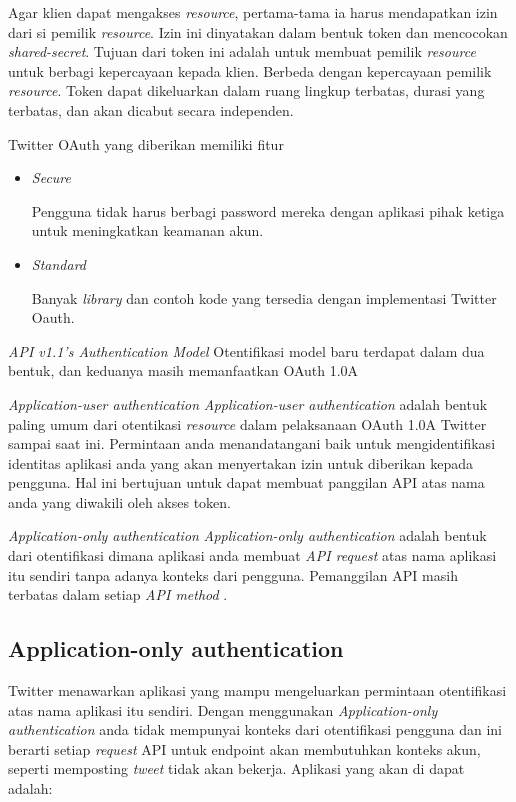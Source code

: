 Agar klien dapat mengakses \textit{resource}, pertama-tama ia harus mendapatkan izin dari si pemilik \textit{resource}. Izin ini dinyatakan dalam bentuk token dan mencocokan \textit{shared-secret}. Tujuan dari token ini adalah untuk membuat pemilik \textit{resource} untuk berbagi kepercayaan kepada klien. Berbeda dengan kepercayaan pemilik \textit{resource}. Token dapat dikeluarkan dalam ruang lingkup terbatas, durasi yang terbatas, dan akan dicabut secara independen.

Twitter OAuth yang diberikan memiliki fitur
\begin{itemize}
	\item \textit{Secure}
	
	Pengguna tidak harus berbagi password mereka dengan aplikasi pihak ketiga untuk meningkatkan keamanan akun.
	\item \textit{Standard}
	
	Banyak \textit{library} dan contoh kode yang tersedia dengan implementasi Twitter Oauth.
\end{itemize}

\textit{API v1.1's Authentication Model}
Otentifikasi model baru terdapat dalam dua bentuk, dan keduanya masih memanfaatkan OAuth 1.0A


\textit{Application-user authentication}
\textit{Application-user authentication} adalah bentuk paling umum dari otentikasi \textit{resource} dalam pelaksanaan OAuth 1.0A Twitter sampai saat ini. Permintaan anda menandatangani baik untuk mengidentifikasi identitas aplikasi anda yang akan menyertakan izin untuk diberikan kepada pengguna. Hal ini bertujuan untuk dapat membuat panggilan API atas nama anda yang diwakili oleh akses token.

\textit{Application-only authentication}
\textit{Application-only authentication} adalah bentuk dari otentifikasi dimana aplikasi anda membuat \textit{API request} atas nama aplikasi itu sendiri tanpa adanya konteks dari pengguna. Pemanggilan API masih terbatas dalam setiap \textit{API method} .


\subsection{Application-only authentication}
Twitter menawarkan aplikasi yang mampu mengeluarkan permintaan otentifikasi atas nama aplikasi itu sendiri. Dengan menggunakan \textit{Application-only authentication} anda tidak mempunyai konteks dari otentifikasi pengguna dan ini berarti setiap \textit{request} API untuk endpoint akan membutuhkan konteks akun, seperti memposting \textit{tweet} tidak akan bekerja. Aplikasi yang akan di dapat adalah: 

